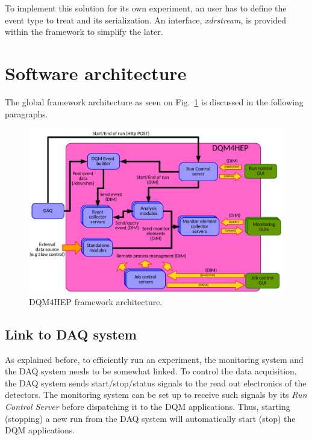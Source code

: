 \documentclass[conference]{IEEEtran}
\begin{document}
To implement this solution for its own experiment, an user has to define the event type to treat and its serialization. An interface, \textit{xdrstream}, is provided within the framework to simplify the later.


\section{Software architecture}

The global framework architecture as seen on Fig.~\ref{fig:DQM4HEPArchitecture} is discussed in the following paragraphs.
\begin{figure}[htbp]
  \begin{center}
    \includegraphics[width=0.95\linewidth]{figs/GlobalArchitectureDiagram.pdf}
    \caption{\label{fig:DQM4HEPArchitecture} DQM4HEP framework architecture.}
  \end{center}
\end{figure}


\subsection{Link to DAQ system}
As explained before, to efficiently run an experiment, the monitoring system and the DAQ system needs to be somewhat linked. To control the data acquisition, the DAQ system sends start/stop/status signals to the read out electronics of the detectors. The monitoring system can be set up to receive such signals by
its \textit{Run Control Server} before dispatching it to the DQM applications. Thus, starting (stopping) a new run from the DAQ system will automatically start (stop) the DQM applications.
\end{document}

